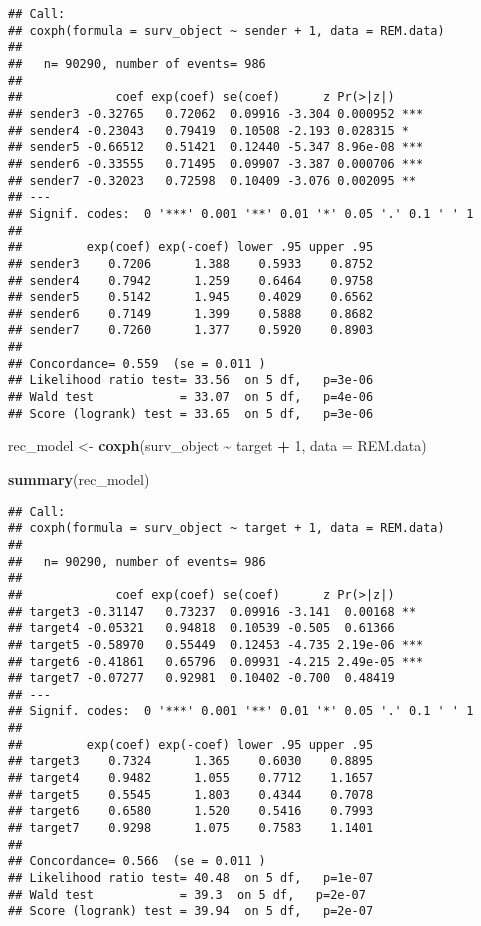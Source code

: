 \documentclass[
]{article}
\newenvironment{Shaded}{\begin{snugshade}}{\end{snugshade}}
\newcommand{\AttributeTok}[1]{\textcolor[rgb]{0.13,0.29,0.53}{#1}}
\newcommand{\DecValTok}[1]{\textcolor[rgb]{0.00,0.00,0.81}{#1}}
\newcommand{\FunctionTok}[1]{\textcolor[rgb]{0.13,0.29,0.53}{\textbf{#1}}}
\newcommand{\NormalTok}[1]{#1}
\newcommand{\OtherTok}[1]{\textcolor[rgb]{0.56,0.35,0.01}{#1}}
\newcommand{\SpecialCharTok}[1]{\textcolor[rgb]{0.81,0.36,0.00}{\textbf{#1}}}
\begin{document}
\begin{verbatim}
## Call:
## coxph(formula = surv_object ~ sender + 1, data = REM.data)
## 
##   n= 90290, number of events= 986 
## 
##             coef exp(coef) se(coef)      z Pr(>|z|)    
## sender3 -0.32765   0.72062  0.09916 -3.304 0.000952 ***
## sender4 -0.23043   0.79419  0.10508 -2.193 0.028315 *  
## sender5 -0.66512   0.51421  0.12440 -5.347 8.96e-08 ***
## sender6 -0.33555   0.71495  0.09907 -3.387 0.000706 ***
## sender7 -0.32023   0.72598  0.10409 -3.076 0.002095 ** 
## ---
## Signif. codes:  0 '***' 0.001 '**' 0.01 '*' 0.05 '.' 0.1 ' ' 1
## 
##         exp(coef) exp(-coef) lower .95 upper .95
## sender3    0.7206      1.388    0.5933    0.8752
## sender4    0.7942      1.259    0.6464    0.9758
## sender5    0.5142      1.945    0.4029    0.6562
## sender6    0.7149      1.399    0.5888    0.8682
## sender7    0.7260      1.377    0.5920    0.8903
## 
## Concordance= 0.559  (se = 0.011 )
## Likelihood ratio test= 33.56  on 5 df,   p=3e-06
## Wald test            = 33.07  on 5 df,   p=4e-06
## Score (logrank) test = 33.65  on 5 df,   p=3e-06
\end{verbatim}

\begin{Shaded}
\begin{Highlighting}[]
\NormalTok{rec\_model }\OtherTok{\textless{}{-}} \FunctionTok{coxph}\NormalTok{(surv\_object }\SpecialCharTok{\textasciitilde{}}\NormalTok{ target }\SpecialCharTok{+} \DecValTok{1}\NormalTok{, }\AttributeTok{data =}\NormalTok{ REM.data)}


\FunctionTok{summary}\NormalTok{(rec\_model)}
\end{Highlighting}
\end{Shaded}

\begin{verbatim}
## Call:
## coxph(formula = surv_object ~ target + 1, data = REM.data)
## 
##   n= 90290, number of events= 986 
## 
##             coef exp(coef) se(coef)      z Pr(>|z|)    
## target3 -0.31147   0.73237  0.09916 -3.141  0.00168 ** 
## target4 -0.05321   0.94818  0.10539 -0.505  0.61366    
## target5 -0.58970   0.55449  0.12453 -4.735 2.19e-06 ***
## target6 -0.41861   0.65796  0.09931 -4.215 2.49e-05 ***
## target7 -0.07277   0.92981  0.10402 -0.700  0.48419    
## ---
## Signif. codes:  0 '***' 0.001 '**' 0.01 '*' 0.05 '.' 0.1 ' ' 1
## 
##         exp(coef) exp(-coef) lower .95 upper .95
## target3    0.7324      1.365    0.6030    0.8895
## target4    0.9482      1.055    0.7712    1.1657
## target5    0.5545      1.803    0.4344    0.7078
## target6    0.6580      1.520    0.5416    0.7993
## target7    0.9298      1.075    0.7583    1.1401
## 
## Concordance= 0.566  (se = 0.011 )
## Likelihood ratio test= 40.48  on 5 df,   p=1e-07
## Wald test            = 39.3  on 5 df,   p=2e-07
## Score (logrank) test = 39.94  on 5 df,   p=2e-07
\end{verbatim}
\end{document}

